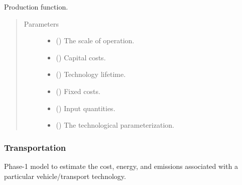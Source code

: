 \documentclass[letterpaper,10pt,english]{sphinxmanual}
\begin{document}
\begin{fulllineitems}
\label{\detokenize{technology:technology.utility_pv.production}}
Production function.
\begin{quote}\begin{description}
\item[{Parameters}] \leavevmode\begin{itemize}
\item {} 
 () \textendash{} The scale of operation.

\item {} 
 () \textendash{} Capital costs.

\item {} 
 () \textendash{} Technology lifetime.

\item {} 
 () \textendash{} Fixed costs.

\item {} 
 () \textendash{} Input quantities.

\item {} 
 () \textendash{} The technological parameterization.

\end{itemize}

\end{description}\end{quote}

\end{fulllineitems}



\subsubsection{Transportation}
\label{\detokenize{technology:module-technology.transport_model}}\label{\detokenize{technology:transportation}}
Phase-1 model to estimate the cost, energy, and emissions associated with a
particular vehicle/transport technology.
\end{document}
